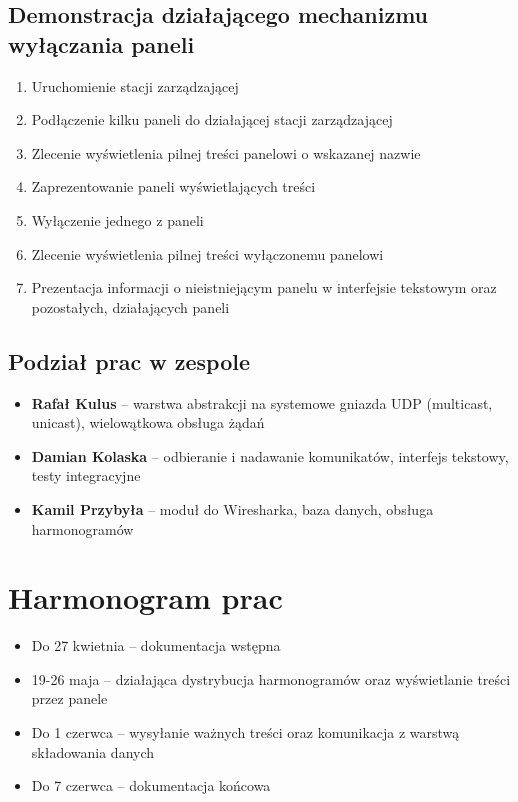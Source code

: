 \documentclass[12pt, a4paper]{article}
\providecommand{\tightlist}{%
  \setlength{\itemsep}{0pt}\setlength{\parskip}{0pt}}
\begin{document}
\hypertarget{demonstracja-dziaux142ajux105cego-mechanizmu-wyux142ux105czania-paneli}{%
\subsection{Demonstracja działającego mechanizmu wyłączania paneli}\label{demonstracja-dziaux142ajux105cego-mechanizmu-wyux142ux105czania-paneli}}

\begin{enumerate}
\def\labelenumi{\arabic{enumi}.}
\tightlist
\item
  Uruchomienie stacji zarządzającej
\item
  Podłączenie kilku paneli do działającej stacji zarządzającej
\item
  Zlecenie wyświetlenia pilnej treści panelowi o wskazanej nazwie
\item
  Zaprezentowanie paneli wyświetlających treści
\item
  Wyłączenie jednego z paneli
\item
  Zlecenie wyświetlenia pilnej treści wyłączonemu panelowi
\item
  Prezentacja informacji o nieistniejącym panelu w interfejsie tekstowym
  oraz pozostałych, działających paneli
\end{enumerate}

\hypertarget{podziaux142-prac-w-zespole}{%
\subsection{Podział prac w zespole}\label{podziaux142-prac-w-zespole}}

\begin{itemize}
\tightlist
\item
  \textbf{Rafał Kulus} -- warstwa abstrakcji na systemowe gniazda UDP
  (multicast, unicast), wielowątkowa obsługa żądań
\item
  \textbf{Damian Kolaska} -- odbieranie i nadawanie komunikatów,
  interfejs tekstowy, testy integracyjne
\item
  \textbf{Kamil Przybyła} -- moduł do Wiresharka, baza danych, obsługa harmonogramów
\end{itemize}

\hypertarget{harmonogram-prac}{%
\section{Harmonogram prac}\label{harmonogram-prac}}

\begin{itemize}
\tightlist
\item
  Do 27 kwietnia -- dokumentacja wstępna
\item
  19-26 maja -- działająca dystrybucja harmonogramów oraz wyświetlanie
  treści przez panele
\item
  Do 1 czerwca -- wysyłanie ważnych treści oraz komunikacja z warstwą
  składowania danych
\item
  Do 7 czerwca -- dokumentacja końcowa
\end{itemize}
\end{document}
